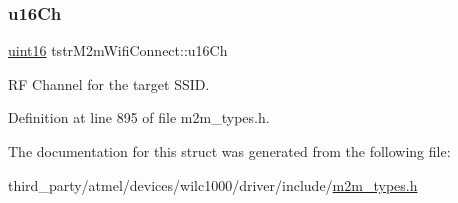 \mbox{\label{structtstrM2mWifiConnect_acfe42b3cc91f29b734505c22f8240d96}} 
\subsubsection{\texorpdfstring{u16\+Ch}{u16Ch}}
{\footnotesize\ttfamily \hyperlink{group__DataT_ga1daa745171fc6e31d942c161422a76f9}{uint16} tstr\+M2m\+Wifi\+Connect\+::u16\+Ch}

RF Channel for the target S\+S\+ID. 

Definition at line 895 of file m2m\+\_\+types.\+h.



The documentation for this struct was generated from the following file\+:\begin{DoxyCompactItemize}
\item 
third\+\_\+party/atmel/devices/wilc1000/driver/include/\hyperlink{m2m__types_8h}{m2m\+\_\+types.\+h}\end{DoxyCompactItemize}
